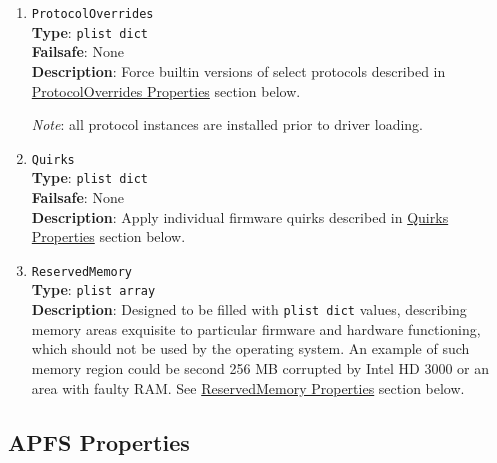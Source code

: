\documentclass[]{article}
\makeatletter
\renewcommand{\label}[1]{%
\zref@wrapper@immediate{\oldlabel{#1}}}  %
\makeatother
\begin{document}
\begin{enumerate}
\item
  \texttt{ProtocolOverrides}\\
  \textbf{Type}: \texttt{plist\ dict}\\
  \textbf{Failsafe}: None\\
  \textbf{Description}: Force builtin versions of select protocols described
  in \hyperref[uefiprotoprops]{ProtocolOverrides Properties} section below.

  \emph{Note}: all protocol instances are installed prior to driver loading.

\item
  \texttt{Quirks}\\
  \textbf{Type}: \texttt{plist\ dict}\\
  \textbf{Failsafe}: None\\
  \textbf{Description}: Apply individual firmware quirks described in
  \hyperref[uefiquirkprops]{Quirks Properties} section below.

\item
  \texttt{ReservedMemory}\\
  \textbf{Type}: \texttt{plist\ array}\\
  \textbf{Description}: Designed to be filled with \texttt{plist\ dict} values,
  describing memory areas exquisite to particular firmware and hardware functioning,
  which should not be used by the operating system. An example of such memory region
  could be second 256 MB corrupted by Intel HD 3000 or an area with faulty RAM.
  See \hyperref[uefirsvdprops]{ReservedMemory Properties} section below.

\end{enumerate}

\subsection{APFS Properties}\label{uefiapfsprops}
\end{document}
